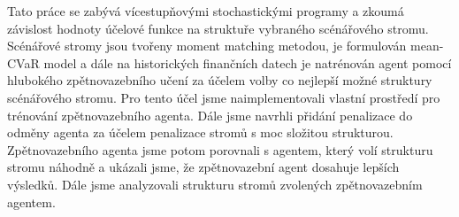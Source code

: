 \documentclass[12pt]{report}
\begin{document}

Tato práce se zabývá vícestupňovými stochastickými programy a zkoumá závislost hodnoty účelové funkce na struktuře vybraného scénářového stromu. Scénářové stromy jsou tvořeny moment matching metodou, je formulován mean-CVaR model a dále na historických finančních datech je natrénován agent pomocí hlubokého zpětnovazebního učení za účelem volby co nejlepší možné struktury scénářového stromu. Pro tento účel jsme naimplementovali vlastní prostředí pro trénování zpětnovazebního agenta. Dále jsme navrhli přidání penalizace do odměny agenta za účelem penalizace stromů s moc složitou strukturou. Zpětnovazebního agenta jsme potom porovnali s agentem, který volí strukturu stromu náhodně a ukázali jsme, že zpětnovazební agent dosahuje lepších výsledků. Dále jsme analyzovali strukturu stromů zvolených zpětnovazebním agentem.
\end{document}

